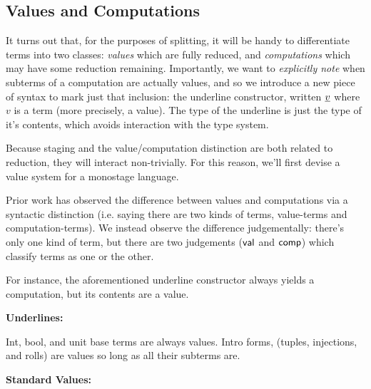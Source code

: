 \documentclass[]{article}
\begin{document}
\begin{abstrsyn}
\subsection{Values and Computations}

It turns out that, for the purposes of splitting, it will be handy to differentiate terms into two classes: 
\emph{values} which are fully reduced, and \emph{computations} which may have some reduction remaining.
Importantly, we want to \emph{explicitly note} when subterms of a computation are actually values,
and so we introduce a new piece of syntax to mark just that inclusion: the underline constructor, written $\underline{v}$
where $v$ is a term (more precisely, a value).  
The type of the underline is just the type of it's contents, which avoids interaction with the type system.

Because staging and the value/computation distinction are both related to reduction, they will interact non-trivially.
For this reason, we'll first devise a value system for a monostage language.

Prior work has observed the difference between values and computations
via a syntactic distinction (i.e. saying there are two kinds of terms, value-terms and computation-terms).
We instead observe the difference judgementally: there's only one kind of term, 
but there are two judgements ($\mathsf{val}$ and $\mathsf{comp}$) which classify terms as one or the other.

For instance, the aforementioned underline constructor always yields a computation,
but its contents are a value.

\begin{framed}
\noindent\textbf{Underlines:}
\end{framed}

Int, bool, and unit base terms are always values.  
Intro forms, (tuples, injections, and rolls) are values so long as all their subterms are.

\begin{framed}
\noindent\textbf{Standard Values:}
\end{framed}


\end{abstrsyn}
\end{document}
